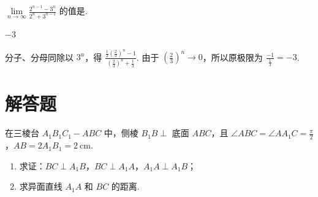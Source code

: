 \begin{problem}

\(\lim\limits_{n\to\infty}\frac{2^{n-1}-3^n}{2^n+3^{n-1}}\) 的值是\fillinblank{}.
\end{problem}

\begin{answer}
\(-3\)
\end{answer}

\begin{solution}
分子、分母同除以 \(3^{n}\)，得
\(\frac{\frac{1}{2}\left(\frac{2}{3}\right)^{n}-1}{\left(\frac{2}{3}\right)^{n}+\frac{1}{3}}\). 由于 \(\left(\frac{2}{3}\right)^{n}\to0\)，所以原极限为 \(\frac{-1}{\frac{1}{3}}=-3\).
\end{solution}

\section{解答题}

\begin{problem}

在三棱台 \(A_{1}B_{1}C_{1}-ABC\) 中，侧棱 \(B_{1}B \perp\) 底面 \(ABC\)，且 \(\angle ABC = \angle AA_{1}C = \frac{\pi}{2}\)，\(AB = 2A_{1}B_{1} = 2\mathrm{~cm}\).

\begin{enumerate}
\item 求证：\(BC \perp A_{1}B\)，\(BC \perp A_{1}A\)，\(A_{1}A \perp A_{1}B\)；
\item 求异面直线 \(A_{1}A\) 和 \(BC\) 的距离.
\end{enumerate}

\end{problem}

